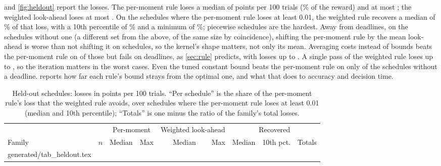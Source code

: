 \documentclass[11pt]{article}
\makeatletter
\newcommand\inputrows[1]{\@@input #1 }
\theoremstyle{definition}
\theoremstyle{remark}
\makeatother
\begin{document}
 and \cref{fig:heldout} report the losses. The per-moment rule loses a median of
\HeldPerMomentMedian{} points per 100 trials (\HeldShareMedian\% of the reward) and at most
\HeldPerMomentMax; the weighted look-ahead loses at most \HeldWeightedMax. On the
\HeldRecoveredCount{} schedules where the per-moment rule loses at least 0.01, the weighted rule
recovers a median of \HeldRecoveredMedian\% of that loss, with a 10th percentile of
\HeldRecoveredPTen\% and a minimum of \HeldRecoveredMin\%; piecewise schedules are the hardest.
Away from deadlines, on the \HeldNoDeadlineCount{} schedules without one (a different set from
the \HeldRecoveredCount{} above, of the same size by coincidence), shifting the per-moment rule
by the mean look-ahead is worse than not shifting it on \HeldShiftMeanWorse{} schedules, so the kernel's shape
matters, not only its mean. Averaging costs instead of bounds beats the per-moment rule on
\HeldAveragedCostBeats{} of those \HeldNoDeadlineCount{} but fails on deadlines, as
\cref{sec:rule} predicts, with losses up to \HeldAveragedCostMax. A single pass of the weighted
rule loses up to \HeldOnePassMax, so the iteration matters in the worst cases. Even the tuned
constant bound beats the per-moment rule on only \HeldBestConstantBeats{} of the
\HeldNoDeadlineCount{} schedules without a deadline.  reports how far each
rule's bound strays from the optimal one, and what that does to accuracy and decision time.

\begin{table}[t]
  \centering
  \small
  \caption{Held-out schedules: losses in points per 100 trials. ``Per schedule'' is the share of the
    per-moment rule's loss that the weighted rule avoids, over schedules where the per-moment rule
    loses at least 0.01 (median and 10th percentile); ``Totals'' is one minus the ratio of the
    family's total losses.}
  \label{tab:heldout}
  \begin{tabular}{lrrrrrrrr}
    \toprule
    & & \multicolumn{2}{c}{Per-moment} & \multicolumn{2}{c}{Weighted look-ahead} & \multicolumn{3}{c}{Recovered} \\
    \cmidrule(lr){3-4} \cmidrule(lr){5-6} \cmidrule(lr){7-9}
    Family & $n$ & Median & Max & Median & Max & Median & 10th pct. & Totals \\
    \midrule
    \inputrows{generated/tab_heldout.tex}
    \bottomrule
  \end{tabular}
\end{table}
\end{document}
